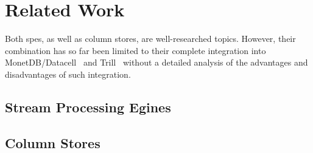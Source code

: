 \section{Related Work}
\label{sec:related-work}

Both \acp{spe}, as well as column stores, are well-researched topics.
However, their combination has so far been limited to their complete integration into MonetDB/Datacell~\cite[]{DBLP:journals/pvldb/LiarouIMK12} and Trill~\cite[]{DBLP:journals/pvldb/ChandramouliGBDPTW14} without a detailed analysis of the advantages and disadvantages of such integration.

\subsection{Stream Processing Egines}

\subsection{Column Stores}